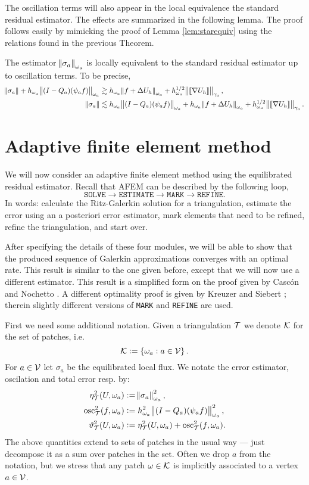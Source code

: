 \documentclass[thesis.tex]{subfiles}
\begin{document}
The oscillation terms will also appear in the local equivalence the standard residual estimator. 
The effects are summarized in the following lemma. The proof follows easily by mimicking the proof of Lemma \ref{lem:starequiv}
using the relations found in the previous Theorem.
\begin{lem}
  \label{lem:locequivosc}
  The estimator $\norm{\sigma_a}_{\omega_a}$ is locally equivalent to the standard residual estimator up to oscillation terms.
  To be precise, 
  \begin{align*}
    \norm{\sigma_a} + h_{\omega_a}\norm{(I - Q_a)(\psi_a f)}_{\omega_a} &\gtrsim h_{\omega_a} \norm{f + \Delta U_h}_{\omega_a} + h^{1/2}_{\omega_a} \norm{\llbracket \nabla U_h \rrbracket}_{\gamma_a},\\
    \norm{\sigma_a} &\lesssim h_{\omega_a}\norm{(I - Q_a)(\psi_a f)}_{\omega_a} + h_{\omega_a} \norm{f + \Delta U_h}_{\omega_a} + h^{1/2}_{\omega_a} \norm{\llbracket \nabla U_h \rrbracket}_{\gamma_a}.
  \end{align*}
\end{lem}
\section{Adaptive finite element method}
We will now consider an adaptive finite element method using the equilibrated residual estimator.
Recall that AFEM can be described by the following loop,
\[
  \texttt{SOLVE} \to \texttt{ESTIMATE} \to \texttt{MARK} \to \texttt{REFINE}.
\]
In words: calculate the Ritz-Galerkin solution for a triangulation, estimate
the error using an a posteriori error estimator, mark elements that need to be refined, refine
the triangulation, and start over. 

After specifying the details of these four modules, we will be able to show that the produced
sequence of Galerkin approximations converges with an optimal rate. This result
is similar to the one given before, except that we will now use a different estimator. This
result is a simplified form on the proof given by Casc\'on and Nochetto \cite{cascon2012}.
A different optimality proof is given by Kreuzer and Siebert \cite{ainsworthbernstein}; therein
slightly different versions of \texttt{MARK} and \texttt{REFINE} are used.

First we need some additional notation. Given a triangulation $\mathcal{T}$ we denote $\mathcal{K}$ for the set of patches, i.e. 
\[
  \mathcal{K} := \set{\omega_a : a \in \mathcal{V}}.
\]
For $a \in \mathcal{V}$ let $\sigma_a$ be the equilibrated local flux. We notate the
  error estimator, oscilation and total error resp. by:
\begin{align*}
  \eta^2_{\mathcal{T}}(U, \omega_a) &:= \norm{\sigma_a}^2_{\omega_a}, \\
  \operatorname{osc}^2_{\mathcal{T}}(f, \omega_a) &:=h^2_{\omega_a} \norm{(I - Q_a) (\psi_a f)}^2_{\omega_a}, \\
  \vartheta^2_{\mathcal{T}}(U, \omega_a) &:= \eta^2_{\mathcal{T}}(U, \omega_a) + \operatorname{osc}^2_{\mathcal{T}}(f, \omega_a).
\end{align*}
The above quantities extend to sets of patches in the usual way 
--- just decompose it as a sum over patches in the set.
Often we drop $a$ from the notation, but we stress that any patch $\omega \in \mathcal{K}$ is implicitly
associated to a vertex $a \in \mathcal{V}$.
\end{document}
